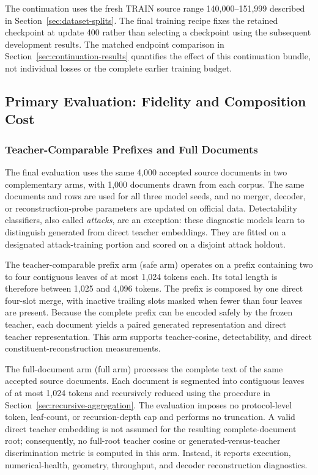 \documentclass[10pt]{article}
\begin{document}
The continuation uses the fresh TRAIN source range
140,000--151,999 described in Section~\ref{sec:dataset-splits}. The final training recipe fixes
the retained checkpoint at update 400 rather than selecting a checkpoint using
the subsequent development results. The matched endpoint comparison in Section~\ref{sec:continuation-results}
quantifies the effect of this continuation bundle, not individual losses or
the complete earlier training budget.


\subsection{Primary Evaluation: Fidelity and Composition Cost}

\subsubsection{Teacher-Comparable Prefixes and Full Documents}
\label{sec:evaluation}

The final evaluation uses the same 4,000 accepted source documents in two
complementary arms, with 1,000 documents drawn from each corpus. The same
documents and rows are used for all three model seeds, and no merger, decoder, or
reconstruction-probe parameters are updated on official data. Detectability
classifiers, also called \emph{attacks}, are an exception: these diagnostic
models learn to distinguish generated from direct teacher embeddings. They are
fitted on a designated attack-training portion and scored on a disjoint
attack holdout.

The teacher-comparable prefix arm (safe arm) operates on a prefix containing two to four
contiguous leaves of at most 1,024 tokens each. Its total length is therefore
between 1,025 and 4,096 tokens. The prefix is composed by one direct four-slot
merge, with inactive trailing slots masked when fewer than four leaves are
present. Because the complete prefix can be encoded safely by the frozen
teacher, each document yields a paired generated representation and direct
teacher representation. This arm supports teacher-cosine, detectability, and
direct constituent-reconstruction measurements.

The full-document arm (full arm) processes the complete text of the same accepted source
documents. Each document is segmented into contiguous leaves of at most 1,024
tokens and recursively reduced using the procedure in Section~\ref{sec:recursive-aggregation}. The
evaluation imposes no protocol-level token, leaf-count, or recursion-depth cap
and performs no truncation. A valid direct teacher embedding is not assumed for
the resulting complete-document root; consequently, no full-root teacher cosine
or generated-versus-teacher discrimination metric is computed in this arm. Instead, it
reports execution, numerical-health, geometry, throughput, and decoder
reconstruction diagnostics.
\end{document}
